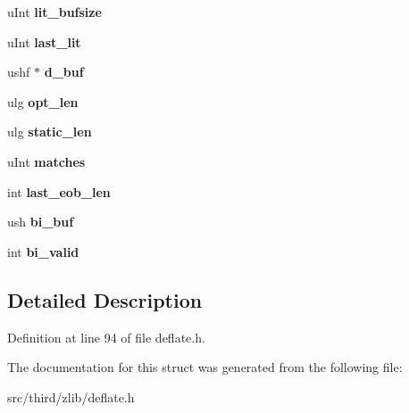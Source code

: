 \begin{DoxyCompactItemize}
\item 
\hypertarget{structdeflate__state_ae4b037b30b470139d10db74e41ffecd9}{u\-Int {\bfseries lit\-\_\-bufsize}}\label{d3/df8/structdeflate__state_ae4b037b30b470139d10db74e41ffecd9}

\item 
\hypertarget{structdeflate__state_af155246f32f2c67278af10673aa61e9c}{u\-Int {\bfseries last\-\_\-lit}}\label{d3/df8/structdeflate__state_af155246f32f2c67278af10673aa61e9c}

\item 
\hypertarget{structdeflate__state_a0826f7358a8ea817a0541462e387306a}{ushf $\ast$ {\bfseries d\-\_\-buf}}\label{d3/df8/structdeflate__state_a0826f7358a8ea817a0541462e387306a}

\item 
\hypertarget{structdeflate__state_a6c96a5f4892f70250e3f024e746676cc}{ulg {\bfseries opt\-\_\-len}}\label{d3/df8/structdeflate__state_a6c96a5f4892f70250e3f024e746676cc}

\item 
\hypertarget{structdeflate__state_abf59dc43ff40f205982b9abe00a7f1e7}{ulg {\bfseries static\-\_\-len}}\label{d3/df8/structdeflate__state_abf59dc43ff40f205982b9abe00a7f1e7}

\item 
\hypertarget{structdeflate__state_a63fd307778454e88756275c9cf95cb60}{u\-Int {\bfseries matches}}\label{d3/df8/structdeflate__state_a63fd307778454e88756275c9cf95cb60}

\item 
\hypertarget{structdeflate__state_a0eb91ea4af2929da63ea6a2c5014a760}{int {\bfseries last\-\_\-eob\-\_\-len}}\label{d3/df8/structdeflate__state_a0eb91ea4af2929da63ea6a2c5014a760}

\item 
\hypertarget{structdeflate__state_ace11da3a5005bdc05961139e379985ef}{ush {\bfseries bi\-\_\-buf}}\label{d3/df8/structdeflate__state_ace11da3a5005bdc05961139e379985ef}

\item 
\hypertarget{structdeflate__state_a8d0532cf7ccbadb87566c13e247e5f78}{int {\bfseries bi\-\_\-valid}}\label{d3/df8/structdeflate__state_a8d0532cf7ccbadb87566c13e247e5f78}

\end{DoxyCompactItemize}


\subsection{Detailed Description}


Definition at line 94 of file deflate.\-h.



The documentation for this struct was generated from the following file\-:\begin{DoxyCompactItemize}
\item 
src/third/zlib/deflate.\-h\end{DoxyCompactItemize}
